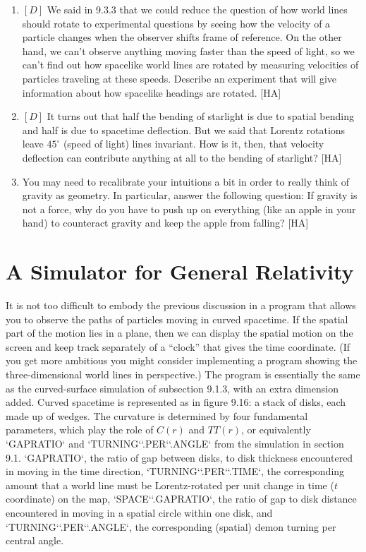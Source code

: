 \documentclass{book}
\begin{document}
\begin{enumerate}
\item $[D]$ We said in 9.3.3 that we could reduce the question of how world
lines should rotate to experimental questions by seeing how the velocity
of a particle changes when the observer shifts frame of reference. On
the other hand, we can't observe anything moving faster than the speed
of light, so we can't find out how spacelike world lines are rotated by
measuring velocities of particles traveling at these speeds. Describe an
experiment that will give information about how spacelike headings are
rotated. [HA]

\item $[D]$ It turns out that half the bending of starlight is due to spatial
bending and half is due to spacetime deflection. But we said that Lorentz
rotations leave $45^{\circ}$ (speed of light) lines invariant. How is it, then,
that velocity deflection can contribute anything at all to the bending
of starlight? [HA]

\item You may need to recalibrate your intuitions a bit in order to really
think of gravity as geometry. In particular, answer the following question: If gravity is not a force, why do you have to push up on everything
(like an apple in your hand) to counteract gravity and keep the apple
from falling? [HA]
\end{enumerate}

\section{A Simulator for General Relativity}

It is not too difficult to embody the previous discussion in a program that
allows you to observe the paths of particles moving in curved spacetime.
If the spatial part of the motion lies in a plane, then we can display the
spatial motion on the screen and keep track separately of a ``clock'' that
gives the time coordinate. (If you get more ambitious you might consider
implementing a program showing the three-dimensional world lines in
perspective.) The program is essentially the same as the curved-surface
simulation of subsection 9.1.3, with an extra dimension added. Curved
spacetime is represented as in figure 9.16: a stack of disks, each made up
of wedges. The curvature is determined by four fundamental parameters,
which play the role of $C(r)$ and $TT(r)$, or equivalently \textsc{`GAPRATIO`} and
\textsc{`TURNING`}\textsc{`.PER`}\textsc{`.ANGLE`} from the simulation in section 9.1. \textsc{`GAPRATIO`}, the ratio of gap between disks, to disk thickness encountered in moving in the time direction,
\textsc{`TURNING`}\textsc{`.PER`}\textsc{`.TIME`}, the corresponding amount that a world line must
be Lorentz-rotated per unit change in time ($t$ coordinate) on the map,
\textsc{`SPACE`}\textsc{`.GAPRATIO`}, the ratio of gap to disk distance encountered in moving
in a spatial circle within one disk, and
\textsc{`TURNING`}\textsc{`.PER`}\textsc{`.ANGLE`}, the corresponding (spatial) demon turning per central
angle.
\end{document}
